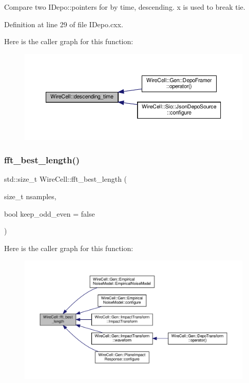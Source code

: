 Compare two I\+Depo\+::pointers for by time, descending. x is used to break tie. 



Definition at line 29 of file I\+Depo.\+cxx.

Here is the caller graph for this function\+:
\nopagebreak
\begin{figure}[H]
\begin{center}
\leavevmode
\includegraphics[width=350pt]{namespace_wire_cell_a8cd3697f742b73810ac49feb370e4a04_icgraph}
\end{center}
\end{figure}
\mbox{\label{namespace_wire_cell_abb6bcae83d0f22d52565724179e9dcd8}} 
\subsubsection{\texorpdfstring{fft\+\_\+best\+\_\+length()}{fft\_best\_length()}}
{\footnotesize\ttfamily std\+::size\+\_\+t Wire\+Cell\+::fft\+\_\+best\+\_\+length (\begin{DoxyParamCaption}\item[{size\+\_\+t}]{nsamples,  }\item[{bool}]{keep\+\_\+odd\+\_\+even = {\ttfamily false} }\end{DoxyParamCaption})}

Here is the caller graph for this function\+:
\nopagebreak
\begin{figure}[H]
\begin{center}
\leavevmode
\includegraphics[width=350pt]{namespace_wire_cell_abb6bcae83d0f22d52565724179e9dcd8_icgraph}
\end{center}
\end{figure}
\mbox{\label{namespace_wire_cell_aeda39bc129b6bab40d0e35ffb4af55ef}} 
